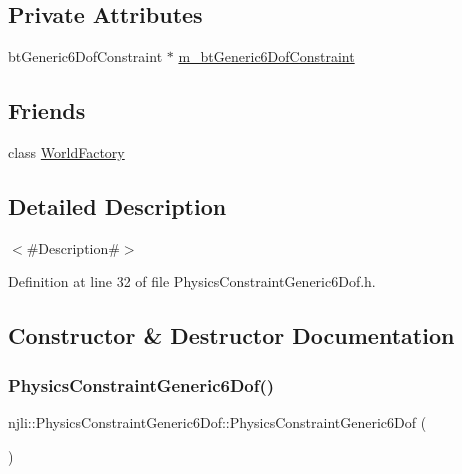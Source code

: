 \subsection*{Private Attributes}
\begin{DoxyCompactItemize}
\item 
bt\+Generic6\+Dof\+Constraint $\ast$ \mbox{\hyperlink{classnjli_1_1_physics_constraint_generic6_dof_a621259b5a4a7a54505a5c73e30772c69}{m\+\_\+bt\+Generic6\+Dof\+Constraint}}
\end{DoxyCompactItemize}
\subsection*{Friends}
\begin{DoxyCompactItemize}
\item 
class \mbox{\hyperlink{classnjli_1_1_physics_constraint_generic6_dof_acb96ebb09abe8f2a37a915a842babfac}{World\+Factory}}
\end{DoxyCompactItemize}


\subsection{Detailed Description}
$<$\#\+Description\#$>$ 

Definition at line 32 of file Physics\+Constraint\+Generic6\+Dof.\+h.



\subsection{Constructor \& Destructor Documentation}
\mbox{\label{classnjli_1_1_physics_constraint_generic6_dof_a5c2718defc17ccb5f247cd5151cd8a82}} 
\subsubsection{\texorpdfstring{Physics\+Constraint\+Generic6\+Dof()}{PhysicsConstraintGeneric6Dof()}\hspace{0.1cm}{\footnotesize\ttfamily [1/3]}}
{\footnotesize\ttfamily njli\+::\+Physics\+Constraint\+Generic6\+Dof\+::\+Physics\+Constraint\+Generic6\+Dof (\begin{DoxyParamCaption}{ }\end{DoxyParamCaption})\hspace{0.3cm}{\ttfamily [protected]}}

